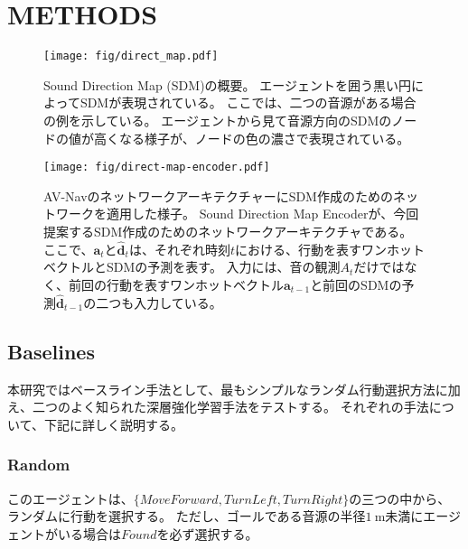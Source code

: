 \section{METHODS}

\begin{figure}[t]
    \begin{center}
        \centering
        \texttt{[image: fig/direct\_map.pdf]}
        \caption{
            Sound Direction Map (SDM)の概要。
            エージェントを囲う黒い円によってSDMが表現されている。
            ここでは、二つの音源がある場合の例を示している。
            エージェントから見て音源方向のSDMのノードの値が高くなる様子が、ノードの色の濃さで表現されている。
        }
        \label{fig:direct_map_abst}
    \end{center}
\end{figure}

\begin{figure*}[t]
    \begin{center}
        \centering
        \texttt{[image: fig/direct-map-encoder.pdf]}
        \caption{
            AV-Nav\cite{chen2020soundspaces}のネットワークアーキテクチャーにSDM作成のためのネットワークを適用した様子。
            Sound Direction Map Encoderが、今回提案するSDM作成のためのネットワークアーキテクチャである。
            ここで、$\boldsymbol{a}_{t}$と$\hat{\boldsymbol{d}}_t$は、それぞれ時刻$t$における、行動を表すワンホットベクトルとSDMの予測を表す。
            入力には、音の観測$A_t$だけではなく、前回の行動を表すワンホットベクトル$\boldsymbol{a}_{t-1}$と前回のSDMの予測$\hat{\boldsymbol{d}}_{t-1}$の二つも入力している。
        }
        \label{fig:direct_map_encoder}
    \end{center}
\end{figure*}

\subsection{Baselines}

本研究ではベースライン手法として、最もシンプルなランダム行動選択方法に加え、二つのよく知られた深層強化学習手法をテストする。
それぞれの手法について、下記に詳しく説明する。

\subsubsection{Random}
このエージェントは、$\{MoveForward, TurnLeft, TurnRight\}$の三つの中から、ランダムに行動を選択する。
ただし、ゴールである音源の半径$1\ \mathrm{m}$未満にエージェントがいる場合は$Found$を必ず選択する。

